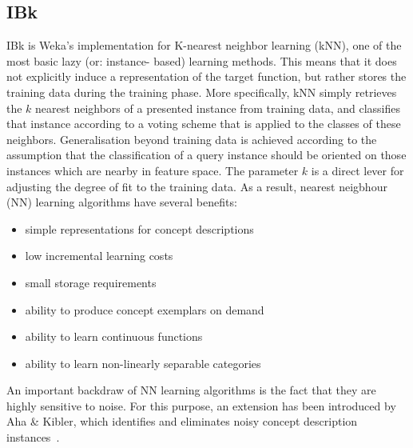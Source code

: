 \subsection{IBk}
IBk is Weka's implementation for K-nearest neighbor learning (kNN), one of the most basic lazy (or: instance-
based) learning methods. This means that it does not explicitly induce a representation of the target function, but rather stores the training data during the training phase. More specifically, kNN simply retrieves the \(k\) nearest neighbors of a presented instance from training data, and classifies that instance according to a voting scheme that is applied to the classes of these neighbors. Generalisation beyond training data is achieved  according to the assumption that the classification of a query instance should be oriented on those instances which are nearby in feature space. The parameter \(k\) is a direct lever for adjusting the degree of fit to the training data. As a result, nearest neigbhour (NN) learning algorithms have several benefits:

\begin{itemize}
\item simple representations for concept descriptions
\item low incremental learning costs
\item small storage requirements
\item ability to produce concept exemplars on demand
\item ability to learn continuous functions
\item ability to learn non-linearly separable categories
\end{itemize}

An important backdraw of NN learning algorithms is the fact that they are highly sensitive to noise. For this purpose, an extension has been introduced by Aha \& Kibler, which identifies and eliminates noisy concept description instances~\cite{Aha91instance-basedlearning}.

